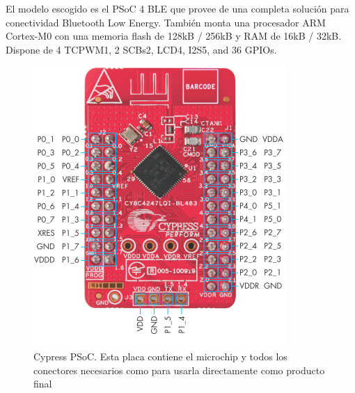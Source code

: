 El modelo escogido es el PSoC 4 BLE que provee de una completa solución para conectividad Bluetooth Low Energy. También monta una procesador ARM Cortex-M0 con una memoria flash de 128kB / 256kB y RAM de 16kB / 32kB. Dispone de 4 TCPWM1, 2 SCBs2, LCD4, I2S5, and 36 GPIOs.

\begin{figure}[h]%
	\centering
    \includegraphics[scale=0.6]{figures/cypress_psoc.PNG} %

    \caption[Cypress PSoC]{Cypress PSoC. Esta placa contiene el microchip y todos los conectores necesarios como para usarla directamente como producto final}

   \label{figuraCypressPeque}
\end{figure}

